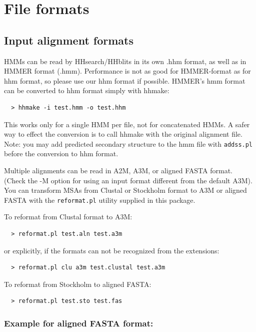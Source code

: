 \documentclass[11pt,a4paper]{article}
\begin{document}
\section{File formats}

\subsection{Input alignment formats} \label{aliformats}

HMMs can be read by HHsearch/HHblits in its own .hhm format, as well as in HMMER format (.hmm).
Performance is not as good for HMMER-format as for hhm format, so please use 
our hhm format if possible. HMMER's hmm format can be converted to hhm format simply 
with hhmake:
\begin{verbatim}
  > hhmake -i test.hmm -o test.hhm
\end{verbatim}

This works only for a single HMM per file, not for concatenated HMMs. A safer way to 
effect the conversion is to call hhmake with the original alignment file. Note: you 
may add predicted secondary structure to the hmm file with \verb`addss.pl` before the 
conversion to hhm format.

Multiple alignments can be read in A2M, A3M, or aligned FASTA format. (Check the -M option for 
using an input format different from the default A3M). You can transform MSAs 
from Clustal or Stockholm format to A3M or aligned FASTA with the \verb`reformat.pl` utility 
supplied in this package. 

To reformat from Clustal format to A3M:
\begin{verbatim}
  > reformat.pl test.aln test.a3m
\end{verbatim}
or explicitly, if the formats can not be recognized from the extensions:
\begin{verbatim}
  > reformat.pl clu a3m test.clustal test.a3m
\end{verbatim}
To reformat from Stockholm to aligned FASTA:
\begin{verbatim}
  > reformat.pl test.sto test.fas
\end{verbatim}


\subsubsection*{Example for aligned FASTA format:}
\end{document}
